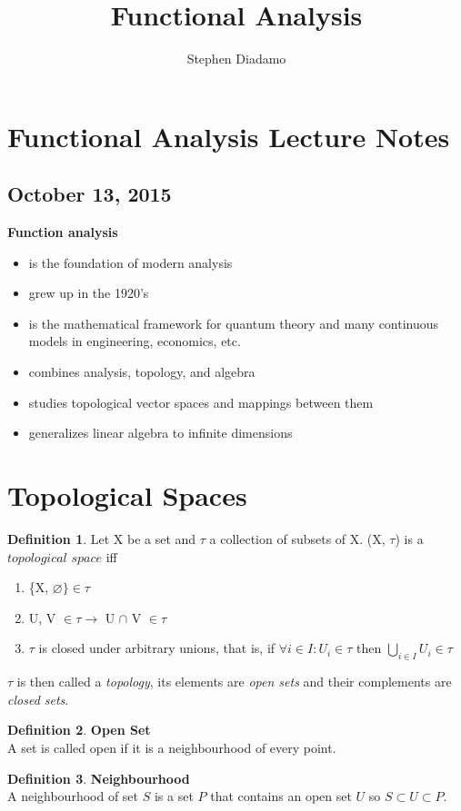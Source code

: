 \documentclass[10pt,a4paper]{article}
\author{Stephen Diadamo}
\title{Functional Analysis}
\theoremstyle{definition}
\newtheorem{definition}{Definition}
\theoremstyle{cor}
\theoremstyle{theorem}
\theoremstyle{lemma}
\theoremstyle{example}
\begin{document}
\section{Functional Analysis Lecture Notes}
\subsection*{October 13, 2015}
\textbf{Function analysis }
\begin{itemize}
	\item is the foundation of modern analysis
	\item grew up in the 1920's
	\item is the mathematical framework for quantum theory and many continuous models in engineering, economics, etc.
	\item combines analysis, topology, and algebra
	\item studies topological vector spaces and mappings between them
	\item generalizes linear algebra to infinite dimensions 
\end{itemize}
\section{Topological Spaces}

\begin{definition}
Let X be a set and $\tau$ a collection of subsets of X. (X, $\tau$) is a $\textit{topological space}$ iff
\begin{enumerate}
\item \{X, $\varnothing \} \in \tau$
\item {U, V} $\in\tau \rightarrow$ U $\cap $ V $\in\tau$
\item $\tau$ is closed under arbitrary unions, that is, if $\forall i\in I : U_i \in\tau$ then $\bigcup_{i \in I} U_i \in \tau$  
\end{enumerate}
\end{definition}
$\tau$ is then called a \textit{topology}, its elements are \textit{open sets} and their complements are \textit{closed sets}.

\begin{definition}
\textbf{Open Set} \\
A set is called open if it is a neighbourhood of every point. 
\end{definition}
\begin{definition}
\textbf{Neighbourhood} \\
A neighbourhood of set $S$ is a set $P$ that contains an open set $U$ so $S \subset U \subset P$. 
\end{definition}
\end{document}
